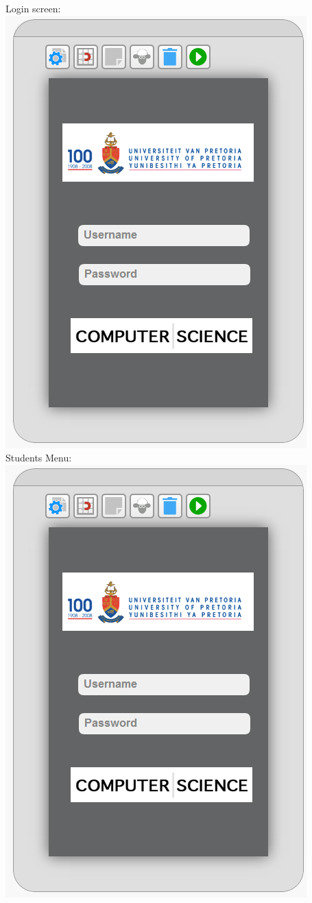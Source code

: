 \documentclass[12pt,a4paper]{article}
\begin{document}
Login screen:\\
\includegraphics[scale=0.4]{login.png} \\
Students Menu:\\
\includegraphics*[scale=0.4]{login.png} 
\end{document}
